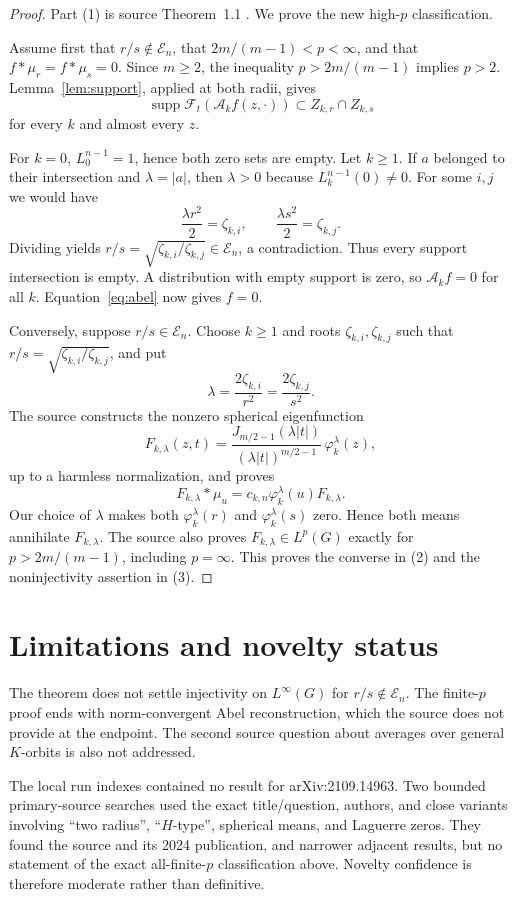 \documentclass[11pt]{article}
\newcommand{\E}{\mathcal{E}}
\newcommand{\A}{\mathcal{A}}
\begin{document}
\begin{proof}
Part (1) is source Theorem~1.1 \cite{N_SY}.  We prove the new high-$p$
classification.

Assume first that $r/s\notin\E_n$, that
$2m/(m-1)<p<\infty$, and that $f*\mu_r=f*\mu_s=0$.  Since $m\geq2$, the
inequality $p>2m/(m-1)$ implies $p>2$.  Lemma~\ref{lem:support}, applied at
both radii, gives
\[
 \operatorname{supp}\mathcal F_t(\A_kf(z,\cdot))
 \subset Z_{k,r}\cap Z_{k,s}
\]
for every $k$ and almost every $z$.

For $k=0$, $L_0^{n-1}=1$, hence both zero sets are empty.  Let $k\geq1$.
If $a$ belonged to their intersection and $\lambda=|a|$, then
$\lambda>0$ because $L_k^{n-1}(0)\neq0$.  For some $i,j$ we would have
\[
 \frac{\lambda r^2}{2}=\zeta_{k,i},
 \qquad
 \frac{\lambda s^2}{2}=\zeta_{k,j}.
\]
Dividing yields
$r/s=\sqrt{\zeta_{k,i}/\zeta_{k,j}}\in\E_n$, a contradiction.  Thus every
support intersection is empty.  A distribution with empty support is zero,
so $\A_kf=0$ for all $k$.  Equation~\eqref{eq:abel} now gives $f=0$.

Conversely, suppose $r/s\in\E_n$.  Choose $k\geq1$ and roots
$\zeta_{k,i},\zeta_{k,j}$ such that
$r/s=\sqrt{\zeta_{k,i}/\zeta_{k,j}}$, and put
\[
 \lambda=\frac{2\zeta_{k,i}}{r^2}
        =\frac{2\zeta_{k,j}}{s^2}.
\]
The source constructs the nonzero spherical eigenfunction
\[
 F_{k,\lambda}(z,t)=
 \frac{J_{m/2-1}(\lambda|t|)}
      {(\lambda|t|)^{m/2-1}}\,\varphi_k^\lambda(z),
\]
up to a harmless normalization, and proves
\[
 F_{k,\lambda}*\mu_u
   =c_{k,n}\varphi_k^\lambda(u)F_{k,\lambda}.
\]
Our choice of $\lambda$ makes both
$\varphi_k^\lambda(r)$ and $\varphi_k^\lambda(s)$ zero.  Hence both means
annihilate $F_{k,\lambda}$.  The source also proves
$F_{k,\lambda}\in L^p(G)$ exactly for
$p>2m/(m-1)$, including $p=\infty$.  This proves the converse in (2) and the
noninjectivity assertion in (3).
\end{proof}

\section{Limitations and novelty status}

The theorem does not settle injectivity on $L^\infty(G)$ for
$r/s\notin\E_n$.  The finite-$p$ proof ends with norm-convergent Abel
reconstruction, which the source does not provide at the endpoint.  The
second source question about averages over general $K$-orbits is also not
addressed.

The local run indexes contained no result for arXiv:2109.14963.  Two bounded
primary-source searches used the exact title/question, authors, and close
variants involving ``two radius'', ``$H$-type'', spherical means, and Laguerre
zeros.  They found the source and its 2024 publication, and narrower adjacent
results, but no statement of the exact all-finite-$p$ classification above.
Novelty confidence is therefore moderate rather than definitive.
\end{document}
